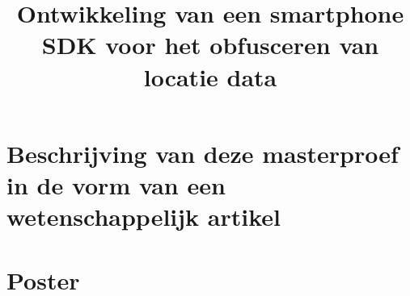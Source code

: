 \documentclass[11pt,a4paper,twoside,openright]{report}
\title{Ontwikkeling van een \newline
smartphone SDK \newline
voor het obfusceren \newline
van locatie data}
\subtitle{}
\begin{document}
\preface%

\printnoidxglossary[type=\acronymtype]%
\clearpage









\printbibliography


\appendix



\chapter{Beschrijving van deze masterproef in de vorm van een wetenschappelijk artikel}


\chapter{Poster}


\end{document}
